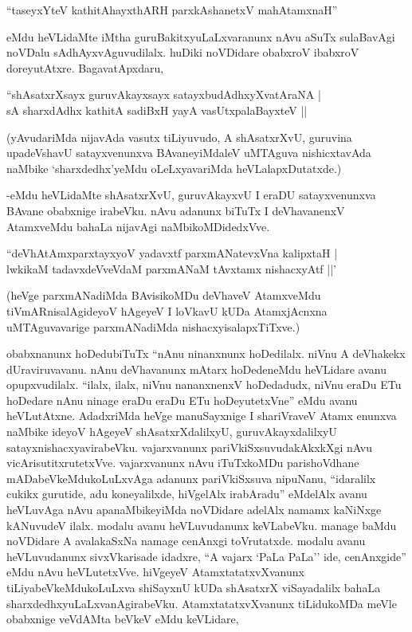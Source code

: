 \begin{shloka}
``taseyxYteV kathitAhayxthARH parxkAshanetxV mahAtamxnaH''
\end{shloka}

eMdu heVLidaMte iMtha guruBakitxyuLaLxvaranunx nAvu aSuTx sulaBavAgi noVDalu sAdhAyxvAguvudilalx. huDiki noVDidare obabxroV ibabxroV doreyutAtxre. BagavatApxdaru,

\begin{shloka}
``shAsatxrXsayx guruvAkayxsayx satayxbudAdhxyXvatAraNA |\\
sA sharxdAdhx kathitA sadiBxH yayA vasUtxpalaBayxteV ||
\end{shloka}

(yAvudariMda nijavAda vasutx tiLiyuvudo, A shAsatxrXvU, guruvina upadeVshavU satayxvenunxva BAvaneyiMdaleV uMTAguva nishicxtavAda naMbike `sharxdedhx'yeMdu oLeLxyavariMda heVLalapxDutatxde.)

-eMdu heVLidaMte shAsatxrXvU, guruvAkayxvU I eraDU satayxvenunxva BAvane obabxnige irabeVku. nAvu adanunx biTuTx I deVhavanenxV AtamxveMdu bahaLa nijavAgi naMbikoMDidedxVve.

\begin{shloka}
``deVhAtAmxparxtayxyoV yadavxtf parxmANatevxVna kalipxtaH |\\
lwkikaM tadavxdeVveVdaM parxmANaM tAvxtamx nishacxyAtf ||'
\end{shloka}

(heVge parxmANadiMda BAvisikoMDu deVhaveV AtamxveMdu tiVmARnisalAgideyoV hAgeyeV I loVkavU kUDa AtamxjAcnxna uMTAguvavarige parxmANadiMda nishacxyisalapxTiTxve.)

obabxnanunx hoDedubiTuTx ``nAnu ninanxnunx hoDedilalx. niVnu A deVhakekx dUraviruvavanu. nAnu deVhavanunx mAtarx hoDedeneMdu heVLidare avanu opupxvudilalx. ``ilalx, ilalx, niVnu nananxnenxV hoDedadudx, niVnu eraDu ETu hoDedare nAnu ninage eraDu eraDu ETu hoDeyutetxVne'' eMdu avanu heVLutAtxne. AdadxriMda heVge manuSayxnige I shariVraveV Atamx enunxva naMbike ideyoV hAgeyeV shAsatxrXdalilxyU, guruvAkayxdalilxyU satayxnishacxyavirabeVku. vajarxvanunx pariVkiSxsuvudakAkxkXgi nAvu vicArisutitxrutetxVve. vajarxvanunx nAvu iTuTxkoMDu parishoVdhane mADabeVkeMdukoLuLxvAga adanunx pariVkiSxsuva nipuNanu, ``idaralilx cukikx gurutide, adu koneyalilxde, hiVgelAlx irabAradu'' eMdelAlx avanu heVLuvAga nAvu apanaMbikeyiMda noVDidare adelAlx namamx kaNiNxge kANuvudeV ilalx. modalu avanu heVLuvudanunx keVLabeVku. manage baMdu noVDidare A avalakaSxNa namage cenAnxgi toVrutatxde. modalu avanu heVLuvudanunx sivxVkarisade idadxre, ``A vajarx `PaLa PaLa'' ide, cenAnxgide'' eMdu nAvu heVLutetxVve. hiVgeyeV AtamxtatatxvXvanunx tiLiyabeVkeMdukoLuLxva shiSayxnU kUDa shAsatxrX viSayadalilx bahaLa sharxdedhxyuLaLxvanAgirabeVku. AtamxtatatxvXvanunx tiLidukoMDa meVle obabxnige veVdAMta beVkeV eMdu keVLidare,

